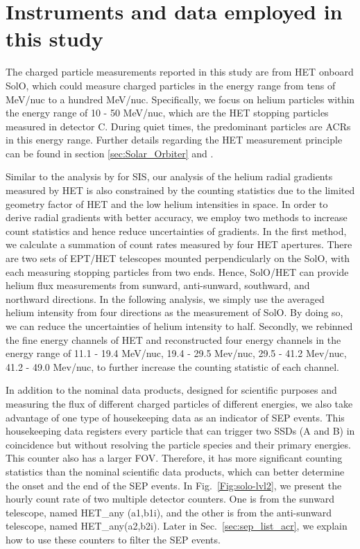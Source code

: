 \section{Instruments and data employed in this study}


The charged particle measurements reported in this study are from \ac{HET} onboard \ac{SolO}, which could measure charged particles in the energy range from tens of MeV/nuc to a hundred MeV/nuc. Specifically, we focus on helium particles within the energy range of 10 - 50 MeV/nuc, which are the \ac{HET} stopping particles measured in detector C. During quiet times, the predominant particles are \acp{ACR} in this energy range. Further details regarding the \ac{HET} measurement principle can be found in section \ref{sec:Solar_Orbiter} and \citet{RodriguezPacheco-2019-EPD}.

Similar to the analysis by \citet{Mason-2021-SolOQuietTime} for \ac{SIS}, our analysis of the helium radial gradients measured by \ac{HET} is also constrained by the counting statistics due to the limited geometry factor of \ac{HET} and the low helium intensities in space. In order to derive radial gradients with better accuracy, we employ two methods to increase count statistics and hence reduce uncertainties of gradients. In the first method, we calculate a summation of count rates measured by four \ac{HET} apertures. There are two sets of \ac{EPT}/\ac{HET} telescopes mounted perpendicularly on the \ac{SolO}, with each measuring stopping particles from two ends. Hence, \ac{SolO}/\ac{HET} can provide helium flux measurements from sunward, anti-sunward, southward, and northward directions. In the following analysis, we simply use the averaged helium intensity from four directions as the measurement of \ac{SolO}. By doing so, we can reduce the uncertainties of helium intensity to half. Secondly, we rebinned the fine energy channels of \ac{HET} and reconstructed four energy channels in the energy range of 11.1 - 19.4 MeV/nuc, 19.4 - 29.5 Mev/nuc, 29.5 - 41.2 Mev/nuc, 41.2 - 49.0 Mev/nuc, to further increase the counting statistic of each channel.



In addition to the nominal data products, designed for scientific purposes and measuring the flux of different charged particles of different energies, we also take advantage of one type of housekeeping data as an indicator of \ac{SEP} events. This housekeeping data registers every particle that can trigger two \acp{SSD} (A and B) in coincidence but without resolving the particle species and their primary energies. This counter also has a larger \ac{FOV}. Therefore, it has more significant counting statistics than the nominal scientific data products, which can better determine the onset and the end of the \ac{SEP} events. In Fig.~\ref{Fig:solo-lvl2}, we present the hourly count rate of two multiple detector counters. One is from the sunward telescope, named HET\_any (a1,b1i), and the other is from the anti-sunward telescope, named HET\_any(a2,b2i). Later in Sec.~\ref{sec:sep_list_acr}, we explain how to use these counters to filter the \ac{SEP} events.


